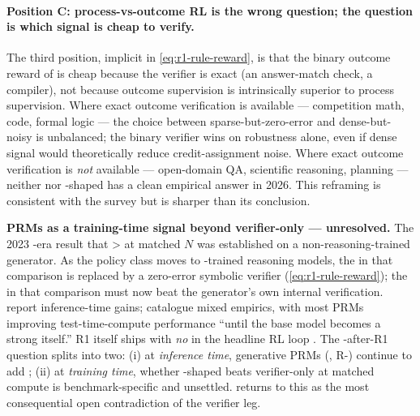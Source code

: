 \paragraph{Position C: process-vs-outcome RL is the wrong question;
the question is which signal is cheap to verify.} The third position,
implicit in \cref{eq:r1-rule-reward}, is that the binary outcome reward
of  is cheap because the verifier is exact (an answer-match check,
a compiler), not because outcome supervision is intrinsically superior
to process supervision. Where exact outcome verification is available
--- competition math, code, formal logic --- the choice between
sparse-but-zero-error and dense-but-noisy is unbalanced; the binary
verifier wins on robustness alone, even if dense signal would
theoretically reduce credit-assignment noise. Where exact outcome
verification is \emph{not} available --- open-domain QA, scientific
reasoning, planning --- neither  nor -shaped  has a clean
empirical answer in 2026. This reframing is consistent with the survey
\citep{zheng2025-prm-survey} but is sharper than its conclusion.

\begin{contradiction}
\textbf{PRMs as a training-time signal beyond verifier-only  ---
unresolved.} The 2023 -era result that  >  at matched
$N$ \citep[Fig.\ 4]{lightman2023-prm800k} was established on a
non-reasoning-trained generator. As the policy class moves to
-trained reasoning models, the  in that comparison is replaced
by a zero-error symbolic verifier (\cref{eq:r1-rule-reward}); the 
in that comparison must now beat the generator's own internal
verification.  report inference-time gains;
\citet{zheng2025-prm-survey} catalogue mixed empirics, with most
PRMs improving test-time-compute performance ``until the base model
becomes a strong  itself.'' R1 itself ships with
\emph{no}  in the headline RL loop \citep[\S 2.2]{deepseek-r1}.
The -after-R1 question splits into two: (i) at \emph{inference
time}, generative PRMs (, R-) continue to add ; (ii)
at \emph{training time}, whether -shaped  beats verifier-only
 at matched compute is benchmark-specific and unsettled.
 returns to this as the most consequential
open contradiction of the verifier leg.
\end{contradiction}

